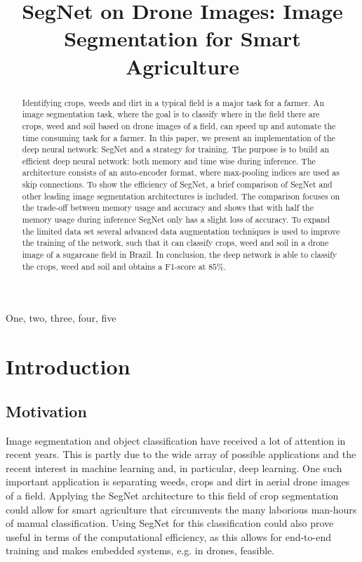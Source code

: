 \documentclass{article}
\title{SegNet on Drone Images: Image Segmentation for Smart Agriculture}
\begin{document}
%

\maketitle
%
\begin{abstract}
 Identifying crops, weeds and dirt in a typical field is a major task for a farmer. An image segmentation task, where the goal is to classify where in the field there are crops, weed and soil based on drone images of a field, can speed up and automate the time consuming task for a farmer. In this paper, we present an implementation of the deep neural network: SegNet and a strategy for training. The purpose is to build an efficient deep neural network: both memory and time wise during inference. The architecture consists of an auto-encoder format, where max-pooling indices are used as skip connections. To show the efficiency of SegNet, a brief comparison of SegNet and other leading image segmentation architectures is included. The comparison focuses on the trade-off between memory usage and accuracy and shows that with half the memory usage during inference SegNet only has a slight loss of accuracy. To expand the limited data set several advanced data augmentation techniques is used to improve the training of the network, such that it can classify crops, weed and soil in a drone image of a sugarcane field in Brazil. In conclusion, the deep network is able to classify the crops, weed and soil and obtains a F1-score at $ 85 \% $. 
\end{abstract}
%
\begin{keywords}
One, two, three, four, five
\end{keywords}
%
\section{Introduction}
\label{sec:intro}

\subsection{Motivation}
Image segmentation and object classification have received a lot of attention in recent years. This is partly due to the wide array of possible applications and the recent interest in machine learning and, in particular, deep learning. One such important application is separating weeds, crops and dirt in aerial drone images of a field. Applying the SegNet architecture to this field of crop segmentation could allow for smart agriculture that circumvents the many laborious man-hours of manual classification. Using SegNet for this classification could also prove useful in terms of the computational efficiency, as this allows for end-to-end training and makes embedded systems, e.g. in drones, feasible.
\end{document}
